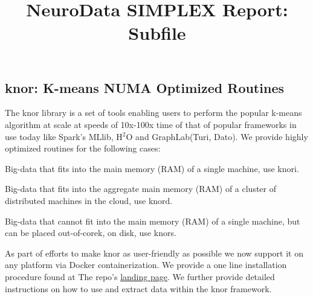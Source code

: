\documentclass[simplex.tex]{subfiles}
\title{NeuroData SIMPLEX Report: Subfile}
\begin{document}

\subsection{knor: K-means NUMA Optimized Routines}

The \textsf{knor} library is a set of tools enabling users to perform the
popular k-means algorithm at scale at speeds of 10x-100x time of that of popular
frameworks in use today like Spark's MLlib, H$^2$O and GraphLab(Turi, Dato).
We provide highly optimized routines for the
following cases:

\begin{compactitem}
    \item Big-data that fits into the main memory (RAM) of a single machine, use
        \textsf{knori}. \newline
    \item Big-data that fits into the aggregate main memory (RAM) of a cluster
        of distributed machines in the cloud, use \textsf{knord}. \newline
    \item Big-data that cannot fit into the main memory (RAM) of a single machine,
        but can be placed out-of-corek, on disk, use \textsf{knors}.
\end{compactitem}

As part of efforts to make \textsf{knor} as user-friendly as possible we now
support it on any platform via Docker containerization. We provide a one line
installation procedure found at The repo's
\href{https://github.com/disa-mhembere/knor/}{landing page}.
We further provide detailed instructions on how to use and extract data within
the \textsf{knor} framework.
\end{document}
